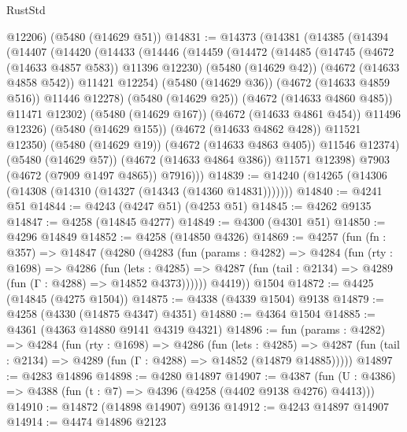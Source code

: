 \begin{lexlean}{RustStd}
\begin{coremodule}
{\begin{coremodule}
{{{{{{{{{{{{{{{{      @12206)
    (@5480 (@14629 @51))
@14831 := @14373
    (@14381
      (@14385
        (@14394
          (@14407
            (@14420
              (@14433
                (@14446
                  (@14459
                    (@14472
                      (@14485
                        (@14745 (@4672 (@14633 @4857 @583)) @11396 @12230)
                        (@5480 (@14629 @42))
                        (@4672 (@14633 @4858 @542))
                        @11421
                        @12254)
                      (@5480 (@14629 @36))
                      (@4672 (@14633 @4859 @516))
                      @11446
                      @12278)
                    (@5480 (@14629 @25))
                    (@4672 (@14633 @4860 @485))
                    @11471
                    @12302)
                  (@5480 (@14629 @167))
                  (@4672 (@14633 @4861 @454))
                  @11496
                  @12326)
                (@5480 (@14629 @155))
                (@4672 (@14633 @4862 @428))
                @11521
                @12350)
              (@5480 (@14629 @19))
              (@4672 (@14633 @4863 @405))
              @11546
              @12374)
            (@5480 (@14629 @57))
            (@4672 (@14633 @4864 @386))
            @11571
            @12398)
          @7903
          (@4672 (@7909 @1497 @4865))
          @7916)))
@14839 := @14240 (@14265 (@14306 (@14308 (@14310 (@14327 (@14343 (@14360 @14831)))))))
@14840 := @4241 @51
@14844 := @4243 (@4247 @51) (@4253 @51)
@14845 := @4262 @9135
@14847 := @4258 (@14845 @4277)
@14849 := @4300 (@4301 @51)
@14850 := @4296 @14849
@14852 := @4258 (@14850 @4326)
@14869 := @4257
    (fun (fn : @357) =>
    @14847
      (@4280
        (@4283
          (fun (params : @4282) =>
          @4284
            (fun (rty : @1698) =>
            @4286
              (fun (lets : @4285) =>
              @4287 (fun (tail : @2134) => @4289 (fun (Γ : @4288) => @14852 @4373))))))
        @4419))
    @1504
@14872 := @4425 (@14845 (@4275 @1504))
@14875 := @4338 (@4339 @1504) @9138
@14879 := @4258 (@4330 (@14875 @4347) @4351)
@14880 := @4364 @1504
@14885 := @4361 (@4363 @14880 @9141 @4319 @4321)
@14896 := fun (params : @4282) =>
  @4284
    (fun (rty : @1698) =>
    @4286
      (fun (lets : @4285) =>
      @4287 (fun (tail : @2134) => @4289 (fun (Γ : @4288) => @14852 (@14879 @14885)))))
@14897 := @4283 @14896
@14898 := @4280 @14897
@14907 := @4387 (fun (U : @4386) => @4388 (fun (t : @7) => @4396 (@4258 (@4402 @9138 @4276) @4413)))
@14910 := @14872 (@14898 @14907) @9136
@14912 := @4243 @14897 @14907
@14914 := @4474 @14896 @2123
}}}}}}}}}}}}}}}}
\end{coremodule}}
\end{coremodule}
\end{lexlean}
